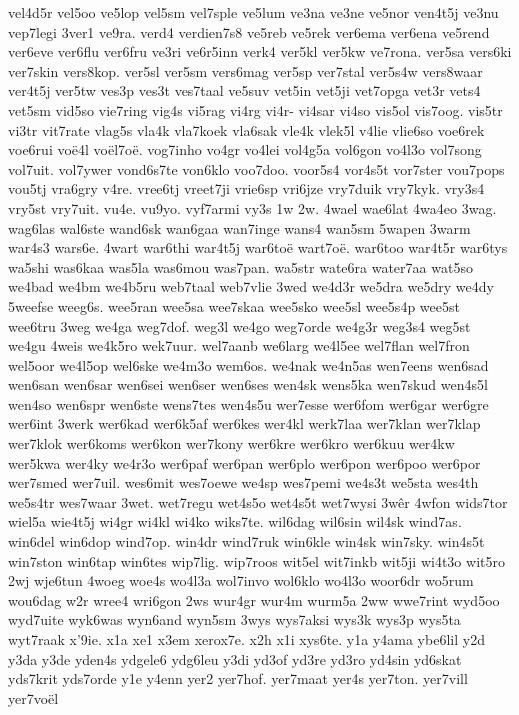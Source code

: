 vel4d5r
vel5oo
ve5lop
vel5sm
vel7sple
ve5lum
ve3na
ve3ne
ve5nor
ven4t5j
ve3nu
vep7legi
3ver1
ve9ra.
verd4
verdien7s8
ve5reb
ve5rek
ver6ema
ver6ena
ve5rend
ver6eve
ver6flu
ver6fru
ve3ri
ve6r5inn
verk4
ver5kl
ver5kw
ve7rona.
ver5sa
vers6ki
ver7skin
vers8kop.
ver5sl
ver5sm
vers6mag
ver5sp
ver7stal
ver5s4w
vers8waar
ver4t5j
ver5tw
ves3p
ves3t
ves7taal
ve5suv
vet5in
vet5ji
vet7opga
vet3r
vets4
vet5sm
vid5so
vie7ring
vig4s
vi5rag
vi4rg
vi4r-
vi4sar
vi4so
vis5ol
vis7oog.
vis5tr
vi3tr
vit7rate
vlag5s
vla4k
vla7koek
vla6sak
vle4k
vlek5l
v4lie
vlie6so
voe6rek
voe6rui
voë4l
voël7oë.
vog7inho
vo4gr
vo4lei
vol4g5a
vol6gon
vo4l3o
vol7song
vol7uit.
vol7ywer
vond6s7te
von6klo
voo7doo.
voor5s4
vor4s5t
vor7ster
vou7pops
vou5tj
vra6gry
v4re.
vree6tj
vreet7ji
vrie6sp
vri6jze
vry7duik
vry7kyk.
vry3s4
vry5st
vry7uit.
vu4e.
vu9yo.
vyf7armi
vy3s
1w
2w.
4wael
wae6lat
4wa4eo
3wag.
wag6las
wal6ste
wand6sk
wan6gaa
wan7inge
wans4
wan5sm
5wapen
3warm
war4s3
wars6e.
4wart
war6thi
war4t5j
war6toë
wart7oë.
war6too
war4t5r
war6tys
wa5shi
was6kaa
was5la
was6mou
was7pan.
wa5str
wate6ra
water7aa
wat5so
we4bad
we4bm
we4b5ru
web7taal
web7vlie
3wed
we4d3r
we5dra
we5dry
we4dy
5weefse
weeg6s.
wee5ran
wee5sa
wee7skaa
wee5sko
wee5sl
wee5s4p
wee5st
wee6tru
3weg
we4ga
weg7dof.
weg3l
we4go
weg7orde
we4g3r
weg3s4
weg5st
we4gu
4weis
we4k5ro
wek7uur.
wel7aanb
we6larg
we4l5ee
wel7flan
wel7fron
wel5oor
we4l5op
wel6ske
we4m3o
wem6os.
we4nak
we4n5as
wen7eens
wen6sad
wen6san
wen6sar
wen6sei
wen6ser
wen6ses
wen4sk
wens5ka
wen7skud
wen4s5l
wen4so
wen6spr
wen6ste
wens7tes
wen4s5u
wer7esse
wer6fom
wer6gar
wer6gre
wer6int
3werk
wer6kad
wer6k5af
wer6kes
wer4kl
werk7laa
wer7klan
wer7klap
wer7klok
wer6koms
wer6kon
wer7kony
wer6kre
wer6kro
wer6kuu
wer4kw
wer5kwa
wer4ky
we4r3o
wer6paf
wer6pan
wer6plo
wer6pon
wer6poo
wer6por
wer7smed
wer7uil.
wes6mit
wes7oewe
we4sp
wes7pemi
we4s3t
we5sta
wes4th
we5s4tr
wes7waar
3wet.
wet7regu
wet4s5o
wet4s5t
wet7wysi
3wêr
4wfon
wids7tor
wiel5a
wie4t5j
wi4gr
wi4kl
wi4ko
wiks7te.
wil6dag
wil6sin
wil4sk
wind7as.
win6del
win6dop
wind7op.
win4dr
wind7ruk
win6kle
win4sk
win7sky.
win4s5t
win7ston
win6tap
win6tes
wip7lig.
wip7roos
wit5el
wit7inkb
wit5ji
wi4t3o
wit5ro
2wj
wje6tun
4woeg
woe4s
wo4l3a
wol7invo
wol6klo
wo4l3o
woor6dr
wo5rum
wou6dag
w2r
wree4
wri6gon
2ws
wur4gr
wur4m
wurm5a
2ww
wwe7rint
wyd5oo
wyd7uite
wyk6was
wyn6and
wyn5sm
3wys
wys7aksi
wys3k
wys3p
wys5ta
wyt7raak
x'9ie.
x1a
xe1
x3em
xerox7e.
x2h
x1i
xys6te.
y1a
y4ama
ybe6lil
y2d
y3da
y3de
yden4s
ydgele6
ydg6leu
y3di
yd3of
yd3re
yd3ro
yd4sin
yd6skat
yds7krit
yds7orde
y1e
y4enn
yer2
yer7hof.
yer7maat
yer4s
yer7ton.
yer7vill
yer7voël
